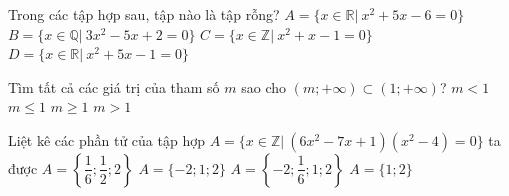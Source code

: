 \begin{ex}%
	Trong các tập hợp sau, tập nào là  tập rỗng?
	 \choice
		 {$A= \{ x \in \mathbb{R} |~ x^2+5x-6=0 \}$}
		{$B=\{  x \in \mathbb{Q} |~ 3x^2-5x+2=0 \}$}
		{\True $C=\{ x\in \mathbb{Z} |~ x^2+x-1=0  \}$}
		{$D=\{ x \in \mathbb{R} |~ x^2+5x-1=0 \}$} 
\end{ex}

\begin{ex}%
	Tìm tất cả các giá trị của  tham số $m$ sao cho $(m;+\infty)\subset(1;+\infty)$?
	 \choice
		{$m<1$} 
		 {$m\leq 1$}
		{\True $m\geq 1$} 
		 {$m>1$}
\end{ex}

\begin{ex}%
	Liệt kê các phần tử của tập hợp $A=\{ x \in \mathbb{Z}|~ (6x^2-7x+1)(x^2-4)=0\}$ ta được 
	\choice 
		 {$A=\left\{\dfrac{1}{6};\dfrac{1}{2};2 \right\}$}
		{\True  $A=\{-2;1;2\}$}
		{$A=\left\{-2;\dfrac{1}{6};1;2  \right\}$}
		 {$A=\{1;2\}$}
\end{ex}

